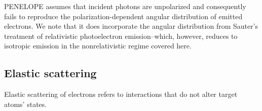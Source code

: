 \documentclass [11pt, proquest, article] {uwthesis}[2016/11/22]
\begin{document}
PENELOPE assumes that incident photons are unpolarized and consequently fails to reproduce the polarization-dependent angular distribution of emitted electrons. 
We note that it does incorporate the angular distribution from Sauter's treatment of relativistic photoelectron emission--which, however, reduces to isotropic emission in the nonrelativistic regime covered here.\cite{sauter1931atomaren}



\subsection{Elastic scattering}
Elastic scattering of electrons refers to interactions that do not alter target atoms' states. 
%

%


%
%
\end{document}
